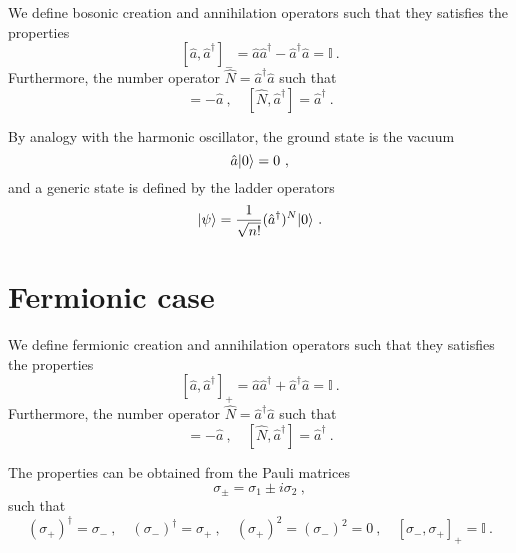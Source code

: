     We define bosonic creation and annihilation operators such that they satisfies the properties 
    \begin{equation}\label{bos}
        [\hat a, \hat a^\dagger]_- = \hat a \hat a^\dagger - \hat a^\dagger \hat a = \mathbb I~.
    \end{equation}
    Furthermore, the number operator $\hat N = \hat a^\dagger \hat a$ such that 
    \begin{equation*}
        [\hat N, \hat a] = - \hat a~, \quad [\hat N, \hat a^\dagger] = \hat a^\dagger ~.
    \end{equation*} 

    By analogy with the harmonic oscillator, the ground state is the vacuum 
    \begin{equation*}
        \hat a \vert0\rangle = 0 ~,
    \end{equation*}
    and a generic state is defined by the ladder operators
    \begin{equation*}
        \vert\psi\rangle = \frac{1}{\sqrt{n!}} (\hat a^\dagger)^N \vert0\rangle ~.
    \end{equation*}

\section{Fermionic case}

    We define fermionic creation and annihilation operators such that they satisfies the properties 
    \begin{equation}\label{ferm}
        [\hat a, \hat a^\dagger]_+ = \hat a \hat a^\dagger + \hat a^\dagger \hat a = \mathbb I ~.
    \end{equation}
    Furthermore, the number operator $\hat N = \hat a^\dagger \hat a$ such that 
    \begin{equation*}
        [\hat N, \hat a] = - \hat a~, \quad [\hat N, \hat a^\dagger] = \hat a^\dagger ~.
    \end{equation*} 

    The properties can be obtained from the Pauli matrices 
    \begin{equation*}
        \sigma_\pm = \sigma_1 \pm i \sigma_2 ~,
    \end{equation*}
    such that 
    \begin{equation*}
        (\sigma_+)^\dagger = \sigma_- ~, \quad (\sigma_-)^\dagger = \sigma_+ ~, \quad (\sigma_+)^2 = (\sigma_-)^2 = 0 ~, \quad [\sigma_-, \sigma_+]_+ = \mathbb I ~.
    \end{equation*}

